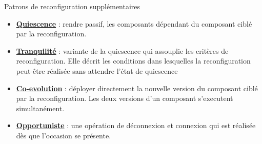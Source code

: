 \begin{frame}{Patrons de reconfiguration supplémentaires}
\begin{itemize}
\setlength\itemsep{0.7cm}
\item \underline{\textbf{Quiescence}} : rendre passif,
les composants dépendant du composant ciblé par la reconfiguration. 
\item \underline{\textbf{Tranquilité}} : variante de la quiescence qui assouplie
les critères de reconfiguration. Elle décrit les conditions dans
lesquelles la reconfiguration peut-être réalisée sans attendre l'état de
quiescence
\item \underline{\textbf{Co-evolution}} : déployer directement la nouvelle version du composant ciblé par la
reconfiguration. Les deux versions d'un
composant s'executent simultanément. 
\item \underline{\textbf{Opportuniste}} : une opération de
déconnexion et connexion qui est réalisée dès que l'occasion se
présente.  
\end{itemize}
\end{frame}
